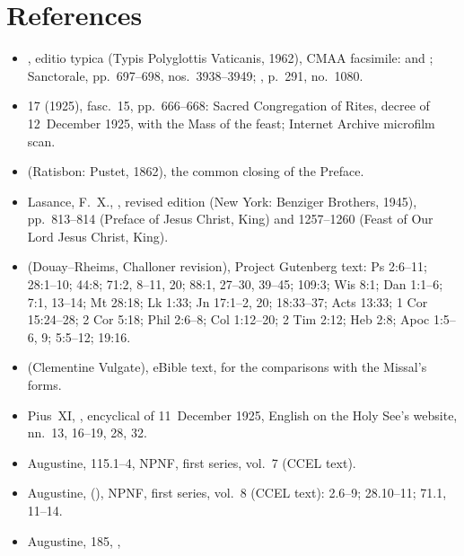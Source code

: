 \section{References}
\label{sec:references}

{\small
\begin{itemize}[leftmargin=1.2em,itemsep=.25em]
\item {}, editio typica (Typis
Polyglottis Vaticanis, 1962), CMAA facsimile:  and
; Sanctorale, pp.~697--698,
nos.~3938--3949; , p.~291, no.~1080.
\item {} 17 (1925), fasc.~15, pp.~666--668: Sacred
Congregation of Rites, decree  of 12~December 1925,
with the Mass of the feast; Internet Archive microfilm scan.
\item {} (Ratisbon: Pustet, 1862), the common closing of
the Preface.
\item Lasance, F.~X., , revised
edition (New York: Benziger Brothers, 1945), pp.~813--814 (Preface of Jesus
Christ, King) and 1257--1260 (Feast of Our Lord Jesus Christ, King).
\item {} (Douay--Rheims,
Challoner revision), Project Gutenberg text: Ps 2:6--11; 28:1--10; 44:8;
71:2, 8--11, 20; 88:1, 27--30, 39--45; 109:3; Wis 8:1; Dan 1:1--6; 7:1,
13--14; Mt 28:18; Lk 1:33; Jn 17:1--2, 20; 18:33--37; Acts 13:33; 1 Cor
15:24--28; 2 Cor 5:18; Phil 2:6--8; Col 1:12--20; 2 Tim 2:12; Heb 2:8; Apoc
1:5--6, 9; 5:5--12; 19:16.
\item {} (Clementine Vulgate), eBible
text, for the comparisons with the Missal's forms.
\item Pius~XI, , encyclical of 11~December 1925, English on
the Holy See's website, nn.~13, 16--19, 28, 32.
\item Augustine,  115.1--4, NPNF, first
series, vol.~7 (CCEL text).
\item Augustine,  (), NPNF, first series, vol.~8 (CCEL text): 2.6--9; 28.10--11; 71.1,
11--14.
\item Augustine,  185, ,

\end{itemize}}
